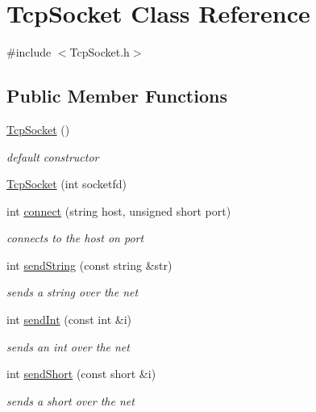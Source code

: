 \hypertarget{class_tcp_socket}{
\section{\-Tcp\-Socket \-Class \-Reference}
\label{class_tcp_socket}
}


{\ttfamily \#include $<$\-Tcp\-Socket.\-h$>$}

\subsection*{\-Public \-Member \-Functions}
\begin{DoxyCompactItemize}
\item 
\hyperlink{class_tcp_socket_a132aa72af141d611f8bad96ba585a79f}{\-Tcp\-Socket} ()
\begin{DoxyCompactList}\small\item\em default constructor \end{DoxyCompactList}\item 
\hyperlink{class_tcp_socket_ae303978c6f57069679951e0dc5180e34}{\-Tcp\-Socket} (int socketfd)
\item 
int \hyperlink{class_tcp_socket_a5800497a4550bf231c82dce401764e89}{connect} (string host, unsigned short port)
\begin{DoxyCompactList}\small\item\em connects to the host on port \end{DoxyCompactList}\item 
int \hyperlink{class_tcp_socket_a987977e736ea8f151edab45e717629b9}{send\-String} (const string \&str)
\begin{DoxyCompactList}\small\item\em sends a string over the net \end{DoxyCompactList}\item 
int \hyperlink{class_tcp_socket_a48a136b315210e63947481b46cf5309e}{send\-Int} (const int \&i)
\begin{DoxyCompactList}\small\item\em sends an int over the net \end{DoxyCompactList}\item 
int \hyperlink{class_tcp_socket_aab4a5fae43ae9fd2ad6b3980f1233b04}{send\-Short} (const short \&i)
\begin{DoxyCompactList}\small\item\em sends a short over the net \end{DoxyCompactList}\item 

\end{DoxyCompactItemize}

